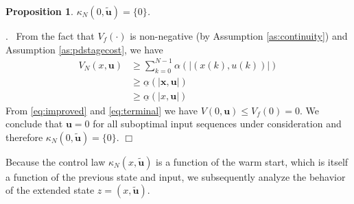 \documentclass{article}
\newtheorem{proposition}{Proposition}
\newenvironment{proof}{\noindent {\em Proof}.\ }{\hspace*{\fill}$\Box$\medskip\\}
\newcommand{\abs}[1]{\left\lvert #1 \right\rvert}
\begin{document}
\begin{proposition}
$\kappa_N(0,\tilde{\mathbf{u}}) = \{0\}$.
\end{proposition}
\begin{proof}
From the fact that $V_f(\cdot)$ is non-negative (by Assumption 
\ref{as:continuity}) and Assumption \ref{as:pdstagecost}, we have
\begin{align}
V_N(x,\mathbf{u}) &\geq \sum^{N-1}_{k=0}\alpha(\abs{(x(k),u(k))}) \nonumber \\
&\geq \underline{\alpha}(\abs{\mathbf{x},\mathbf{u}}) \nonumber \\
\label{eq:lowerbound}
&\geq \underline{\alpha}(\abs{x,\mathbf{u}})
\end{align}
From \eqref{eq:improved} and \eqref{eq:terminal} we have $V(0,
\mathbf{u}) \leq V_f(0)=0$. We conclude that $\mathbf{u} = 0$ for all 
suboptimal input sequences under consideration and therefore
$\kappa_N(0,\tilde{\mathbf{u}}) = \{0\}$.
\end{proof}

Because the control law $\kappa_N(x,\tilde{\mathbf{u}})$ is a function of the warm start, which is
itself a function of the previous state and input, we subsequently analyze the behavior of the
extended state $z = (x,\tilde{\mathbf{u}})$. 
\end{document}
